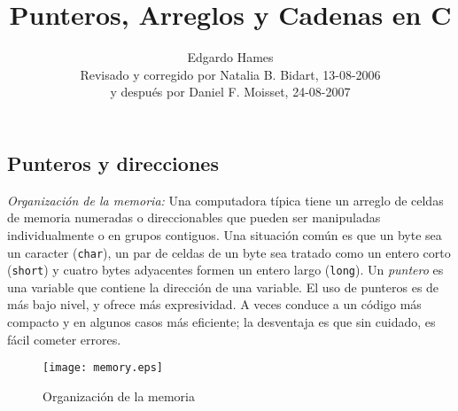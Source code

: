 \documentclass[12pt,a4paper,spanish]{article}
\begin{document}
\title{Punteros, Arreglos y Cadenas en \textsf{C}}
\author{Edgardo Hames \\ \small{Revisado y corregido por Natalia B. Bidart, 13-08-2006}
 \\ \small{y después por Daniel F. Moisset, 24-08-2007}}
\date{}

\maketitle
\makeatother

\subsection*{Punteros y direcciones}

\textit{Organización de la memoria:} Una computadora típica tiene un arreglo de
celdas de memoria numeradas o direccionables que pueden ser manipuladas
individualmente o en grupos contiguos. Una situación común es que un byte sea un
caracter (\verb+char+), un par de celdas de un byte sea tratado como un entero
corto (\verb+short+) y cuatro bytes adyacentes formen un entero largo (\verb+long+).
Un \textit{puntero} es una variable que contiene la dirección de una variable. El
uso de punteros es de más bajo nivel, y ofrece más expresividad. A veces conduce
a un código más compacto y en algunos casos más eficiente; la desventaja es que
sin cuidado, es fácil cometer errores.

\begin{figure}[htbp]
\begin{center}
\texttt{[image: memory.eps]}
\caption{Organización de la memoria}
\label{fig: mem_org}
\end{center}
\end{figure}
\end{document}
